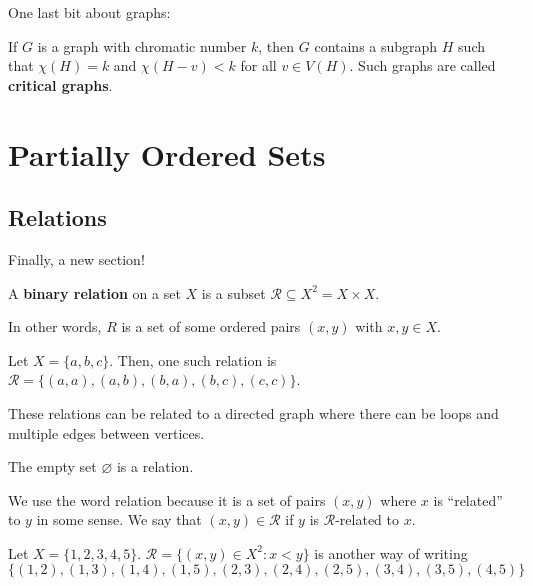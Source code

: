
One last bit about graphs:

\begin{note}
	If \( G \) is a graph with chromatic number \( k \), then \( G \) contains a subgraph \( H \) such that \( \chi (H)=k \) and \( \chi (H-v) < k \) for all \( v \in  V(H) \). Such graphs are called \textbf{critical graphs}.
\end{note}

\section{Partially Ordered Sets}

\subsection{Relations}

Finally, a new section!

\begin{definition}
	A \textbf{binary relation} on a set \( X \) is a subset \( \mathcal{R} \subseteq X^2 = X \times X \).
\end{definition}

In other words, \( R \) is a set of some ordered pairs \( (x,y) \) with \( x,y \in  X \).

\begin{eg}
	Let \( X=\{a,b,c\}   \). Then, one such relation is \( \mathcal{R}=\{(a,a),(a,b),(b,a),(b,c),(c,c)\}   \).
\end{eg}

\begin{note}
	These relations can be related to a directed graph where there can be loops and multiple edges between vertices.
\end{note}

\begin{eg}
	The empty set \( \varnothing \) is a relation.
\end{eg}

We use the word relation because it is a set of pairs \( (x,y) \) where \( x \) is ``related'' to \( y \) in some sense. We say that \( (x,y) \in \mathcal{R} \) if \( y \) is \( \mathcal{R} \)-related to \( x \).

\begin{eg}
	Let \( X=\{1,2,3,4,5\}   \). \( \mathcal{R}=\{ (x,y) \in X^2 \colon x < y\} \) is another way of writing \( \{(1,2),(1,3),(1,4),(1,5),(2,3),(2,4),(2,5),(3,4),(3,5),(4,5)\}    \)
\end{eg}

